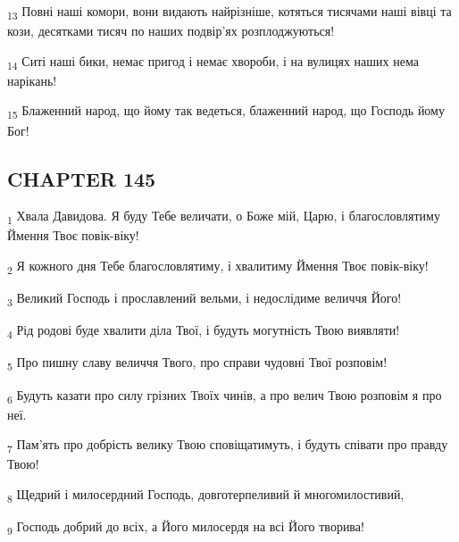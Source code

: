 \begin{tcolorbox}
\textsubscript{13} Повні наші комори, вони видають найрізніше, котяться тисячами наші вівці та кози, десятками тисяч по наших подвір'ях розплоджуються!
\end{tcolorbox}
\begin{tcolorbox}
\textsubscript{14} Ситі наші бики, немає пригод і немає хвороби, і на вулицях наших нема нарікань!
\end{tcolorbox}
\begin{tcolorbox}
\textsubscript{15} Блаженний народ, що йому так ведеться, блаженний народ, що Господь йому Бог!
\end{tcolorbox}
\subsection{CHAPTER 145}
\begin{tcolorbox}
\textsubscript{1} Хвала Давидова. Я буду Тебе величати, о Боже мій, Царю, і благословлятиму Ймення Твоє повік-віку!
\end{tcolorbox}
\begin{tcolorbox}
\textsubscript{2} Я кожного дня Тебе благословлятиму, і хвалитиму Ймення Твоє повік-віку!
\end{tcolorbox}
\begin{tcolorbox}
\textsubscript{3} Великий Господь і прославлений вельми, і недослідиме величчя Його!
\end{tcolorbox}
\begin{tcolorbox}
\textsubscript{4} Рід родові буде хвалити діла Твої, і будуть могутність Твою виявляти!
\end{tcolorbox}
\begin{tcolorbox}
\textsubscript{5} Про пишну славу величчя Твого, про справи чудовні Твої розповім!
\end{tcolorbox}
\begin{tcolorbox}
\textsubscript{6} Будуть казати про силу грізних Твоїх чинів, а про велич Твою розповім я про неї.
\end{tcolorbox}
\begin{tcolorbox}
\textsubscript{7} Пам'ять про добрість велику Твою сповіщатимуть, і будуть співати про правду Твою!
\end{tcolorbox}
\begin{tcolorbox}
\textsubscript{8} Щедрий і милосердний Господь, довготерпеливий й многомилостивий,
\end{tcolorbox}
\begin{tcolorbox}
\textsubscript{9} Господь добрий до всіх, а Його милосердя на всі Його творива!
\end{tcolorbox}
